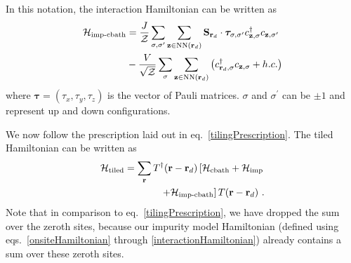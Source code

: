 \documentclass[reprint,hidelinks,onecolumn]{revtex4-2}
\begin{document}
In this notation, the interaction Hamiltonian can be written as
\begin{equation}\begin{aligned}\label{interactionHamiltonian}
	\mathcal{H}_\text{imp-cbath} &= \frac{J}{\mathcal{Z}}\sum_{\sigma,\sigma^\prime}\sum_{{\bf z}\in\text{NN}({\bf r}_d)} {\bf S}_{{\bf r}_d}\cdot{\boldsymbol \tau}_{\sigma,\sigma^\prime}c^\dagger_{{\bf z},\sigma}c_{{\bf z},\sigma^\prime} \\
								 & - \frac{V}{\sqrt{\mathcal{Z}}}\sum_{\sigma} \sum_{{\bf z}\in\text{NN}({\bf r}_d)}\left(c^\dagger_{{\bf r}_d,\sigma} c_{{{\bf z}},\sigma} + h.c.\right)
\end{aligned}\end{equation}
where \(\boldsymbol \tau = \left( \tau_x, \tau_y, \tau_z \right) \) is the vector of Pauli matrices. \(\sigma\) and \(\sigma^\prime\) can be \(\pm 1\) and represent up and down configurations.

We now follow the prescription laid out in eq.~\ref{tilingPrescription}. The tiled Hamiltonian can be written as 
\begin{equation}\begin{aligned}
	\mathcal{H}_\text{tiled} = \sum_{{\bf r}}T^\dagger({\bf r} - {\bf r}_d)\left[\mathcal{H}_\text{cbath} + \mathcal{H}_\text{imp} \right.\\
\left.+ \mathcal{H}_\text{imp-cbath}\right]T({\bf r} - {\bf r}_d)~.
\end{aligned}\end{equation}
Note that in comparison to eq.~\ref{tilingPrescription}, we have dropped the sum over the zeroth sites, because our impurity model Hamiltonian (defined using eqs.~\ref{onsiteHamiltonian} through \ref{interactionHamiltonian}) already contains a sum over these zeroth sites.
\end{document}
